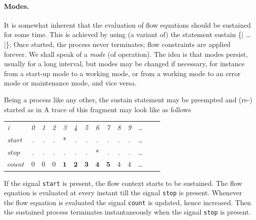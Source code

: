 \paragraph{Modes.} 
It is somewhat inherent that the  evaluation of flow equations 
should be sustained for some time. 
This is achieved by using (a variant of) the  statement
%
\BEP
    sustain \{|
       \ldots
    |\};
\EEP
%
Once started, the  process never terminates; flow 
constraints are applied forever. We shall speak of a \emph{mode} (of 
operation). The idea is that modes persist, usually for a long interval,
but modes may be changed if necessary, for instance from a start-up mode
to a working mode, or from a working mode to an error mode or maintenance mode, 
and vice versa.

Being a process like any other, the sustain statement may be preempted and (re-) started as in
%
%
A trace of this fragment may look like as follows
\begin{center}
  \leavevmode
  \begin{tabular}[]{l@{\quad}||@{\quad}ccccccccccccc}
    \hline\hline
     \hbox{{\footnotesize \textit{i}}} &{\footnotesize \textit{0}}
     &{\footnotesize \textit{1}}&{\footnotesize \textit{2}}
     &{\footnotesize \textit{3}}&{\footnotesize \textit{4}}
     &{\footnotesize \textit{5}}&{\footnotesize \textit{6}}
     &{\footnotesize \textit{7}}&{\footnotesize \textit{8}}
     &{\footnotesize \textit{9}}&\ldots
   \\      
   \hbox{$start$} &.&.&.&*&.&.&.&.&.&.&\ldots
   \\
    \hbox{$stop$} &.&.&.&.&.&.&*&.&.&.&\ldots
   \\     
   \hbox{$count$}&$\mathit{0}$&$\mathit{0}$&$\mathit{0}$&
   $\mathbf{1}$&$\mathbf{2}$&$\mathbf{3}$&
   $\mathbf{4}$&$\mathbf{5}$&$\mathit{4}$&$\mathit{4}$&\ldots
   \\
  
  \hline\hline
  \end{tabular}
\end{center}
If the signal \texttt{start} is present, the flow context starts to be
sustained.  The flow equation is evaluated at every instant till
the signal \texttt{stop} is present. Whenever the flow equation is evaluated
the signal \texttt{count} is updated, hence increased. Then the sustained process terminates instantaneously when the signal \texttt{stop} is present. 

